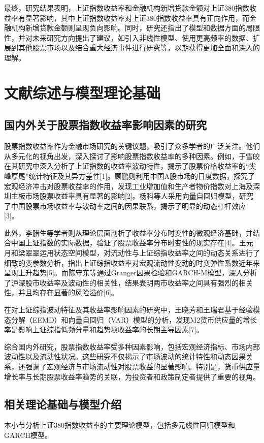 \documentclass[12pt, a4paper]{article}
\numberwithin{equation}{section}
\begin{document}
最终，研究结果表明，上证指数收益率和金融机构新增贷款金额对上证380指数收益率有显著影响，其中上证指数收益率对上证380指数收益率具有正向作用，而金融机构新增贷款金额则呈现负向影响。同时，研究还指出了模型和数据方面的局限性，并对未来研究方向提出了建议，如引入非线性模型、使用更高频率的数据、扩展到其他股票市场以及结合重大经济事件进行研究等，以期获得更加全面和深入的理解。

\newpage
\section{文献综述与模型理论基础}
\subsection{国内外关于股票指数收益率影响因素的研究}
股票指数收益率作为金融市场研究的关键议题，吸引了众多学者的广泛关注。他们从多元化的视角出发，深入探讨了影响股票指数收益率的多种因素。例如，于雪皎在其研究中深入分析了上证指数的收益率波动特性，揭示了股票价格收益率的“尖峰厚尾”统计特征及其异方差性[1]。顾鹏则利用中国A股市场的日度数据，探究了宏观经济冲击对股票收益率的作用，发现工业增加值和生产者物价指数对上海及深圳主板市场股票收益率具有显著的影响[2]。杨科等人采用向量自回归模型，研究了中国股票市场收益率与波动率之间的因果联系，揭示了明显的动态杠杆效应[3]。

此外，李腊生等学者则从理论层面剖析了收益率分布时变性的微观经济基础，并结合中国上证指数的实际数据，验证了股票收益率分布时变性的现实存在[4]。王元月和梁翠翠运用状态空间模型，对流动性与上证综指收益率之间的动态关系进行了细致的变参数分析，指出上证综指收益率对宏观流动性变动的时变弹性系数近年来呈现上升趋势[5]。而陈守东等通过Granger因果检验和GARCH-M模型，深入分析了沪深股市收益率及波动性的相关性，结果表明两市收益率之间具有强烈的相关性，并且均存在显著的风险溢价[6]。

在对上证综指波动特征及其收益率影响因素的研究中，王晓芳和王瑞君基于经验模态分解（EEMD）和向量自回归（VAR）模型的分析，发现M2货币供应量的增长率是影响上证综指低频分量和趋势项收益率的长期主导因素[7]。

综合国内外研究，股票指数收益率受多种因素影响，包括宏观经济指标、市场内部波动性以及流动性状况。这些研究不仅揭示了市场波动的统计特性和动态因果关系，还强调了宏观经济与市场流动性对股票收益的显著影响。特别是，货币供应量增长率与长期股票收益率趋势的关联，为投资者和政策制定者提供了重要的视角。
\subsection{相关理论基础与模型介绍}
本小节分析上证380指数收益率的主要理论模型，包括多元线性回归模型和GARCH模型。
\end{document}
